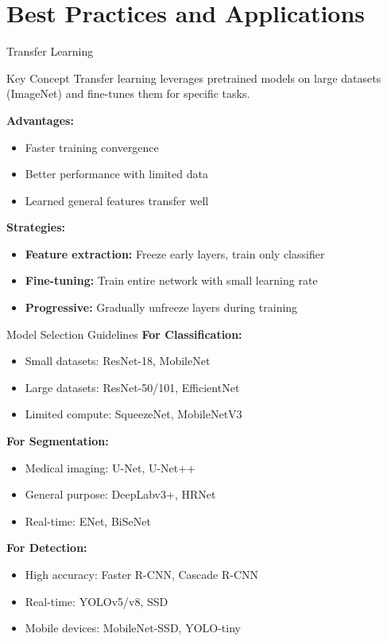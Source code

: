 \documentclass[aspectratio=169,10pt]{beamer}
\begin{document}
\section{Best Practices and Applications}

\begin{frame}{Transfer Learning}
\begin{alertblock}{Key Concept}
Transfer learning leverages pretrained models on large datasets (ImageNet) and fine-tunes them for specific tasks.
\end{alertblock}

\textbf{Advantages:}
\begin{itemize}
\item Faster training convergence
\item Better performance with limited data
\item Learned general features transfer well
\end{itemize}

\textbf{Strategies:}
\begin{itemize}
\item \textbf{Feature extraction:} Freeze early layers, train only classifier
\item \textbf{Fine-tuning:} Train entire network with small learning rate
\item \textbf{Progressive:} Gradually unfreeze layers during training
\end{itemize}
\end{frame}

\begin{frame}{Model Selection Guidelines}
\textbf{For Classification:}
\begin{itemize}
\item Small datasets: ResNet-18, MobileNet
\item Large datasets: ResNet-50/101, EfficientNet
\item Limited compute: SqueezeNet, MobileNetV3
\end{itemize}

\textbf{For Segmentation:}
\begin{itemize}
\item Medical imaging: U-Net, U-Net++
\item General purpose: DeepLabv3+, HRNet
\item Real-time: ENet, BiSeNet
\end{itemize}

\textbf{For Detection:}
\begin{itemize}
\item High accuracy: Faster R-CNN, Cascade R-CNN
\item Real-time: YOLOv5/v8, SSD
\item Mobile devices: MobileNet-SSD, YOLO-tiny
\end{itemize}
\end{frame}
\end{document}
